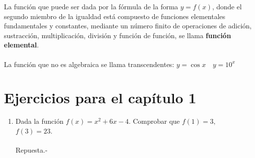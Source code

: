     \begin{tcolorbox}[colframe = white]
	\begin{def.}
	   La función que puede ser dada por la fórmula de la forma $y=f(x)$, donde el segundo miembro de la igualdad está compuesto de funciones elementales fundamentales y constantes, mediante un número finito de operaciones de adición, sustracción, multiplicación, división y función de función, se llama \textbf{función elemental}.\\\\ 
	   La función que no es algebraica se llama transcendentes: $y=\cos x \quad y=10^x$\\
	\end{def.}
    \end{tcolorbox}

\section{Ejercicios para el capítulo 1}

\begin{enumerate}

    \item Dada la función $f(x)=x^2+6x-4.$ Comprobar que $f(1)=3,$ $f(3)=23$.\\\\
	Repuesta.-\;

\end{enumerate}
